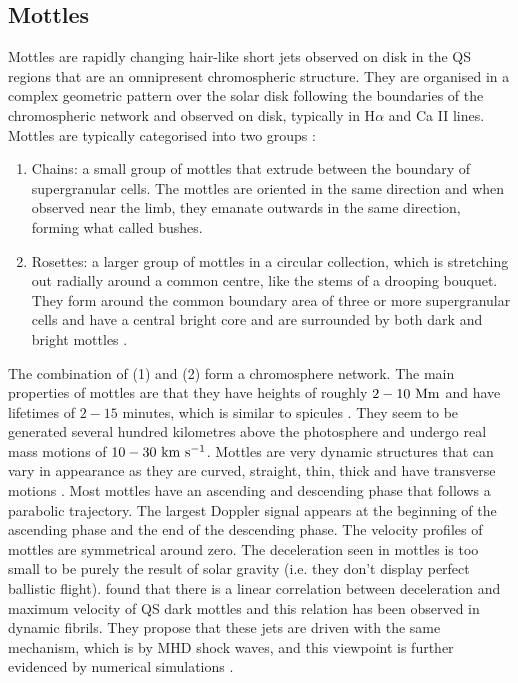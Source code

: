 \documentclass[12pt]{ociamthesis}
\newcommand{\kms}{~\rm{km ~s^{-1}}}
\newcommand{\np}{\\ \\}
\begin{document}
\subsection{Mottles}
\label{subsec:mots}
Mottles are rapidly changing hair-like short jets observed on disk in the QS regions that are an omnipresent chromospheric structure. They are organised in a complex geometric pattern over the solar disk following the boundaries of the chromospheric network and observed on disk, typically in H$\alpha$ and Ca II lines. Mottles are typically categorised into two groups \citep{Beckers1963ApJ138648B}:
\begin{enumerate}
\item Chains: a small group of mottles that extrude between the boundary of supergranular cells. The mottles are oriented in the same direction and when observed near the limb, they emanate outwards in the same direction, forming what \cite{Cragg1963ApJ138303C} called bushes.
\item Rosettes: a larger group of mottles in a circular collection, which is stretching out radially around a common centre, like the stems of a drooping bouquet. They form around the common boundary area of three or more supergranular cells and have a central bright core and are surrounded by both dark and bright mottles \citep{Tsiropoula2012}.    
\end{enumerate}
The combination of (1) and (2) form a chromosphere network. The main properties of mottles are that they have heights of roughly $2-10~\rm{Mm}$ and have lifetimes of $2-15$ minutes, which is similar to spicules \citep{Suematsu1995ApJ}. They seem to be generated several hundred kilometres above the photosphere and undergo real mass motions of $10-30\kms$. Mottles are very dynamic structures that can vary in appearance as they are curved, straight, thin, thick and have transverse motions \citep{De_Pontieu2007ApJ}. Most mottles have an ascending and descending phase that follows a parabolic trajectory. The largest Doppler signal appears at the beginning of the ascending phase and the end of the descending phase. The velocity profiles of mottles are symmetrical around zero. The deceleration seen in mottles is too small to be purely the result of solar gravity (i.e. they don't display perfect ballistic flight). \cite{Rouppe2007ApJ660L169R} found that there is a linear correlation between deceleration and maximum velocity of QS dark mottles and this relation has been observed in dynamic fibrils. They propose that these jets are driven with the same mechanism, which is by MHD shock waves, and this viewpoint is further evidenced by numerical simulations \citep{De_Pontieu2007ApJ, Hansteen2006ApJ}. \np
\end{document}
